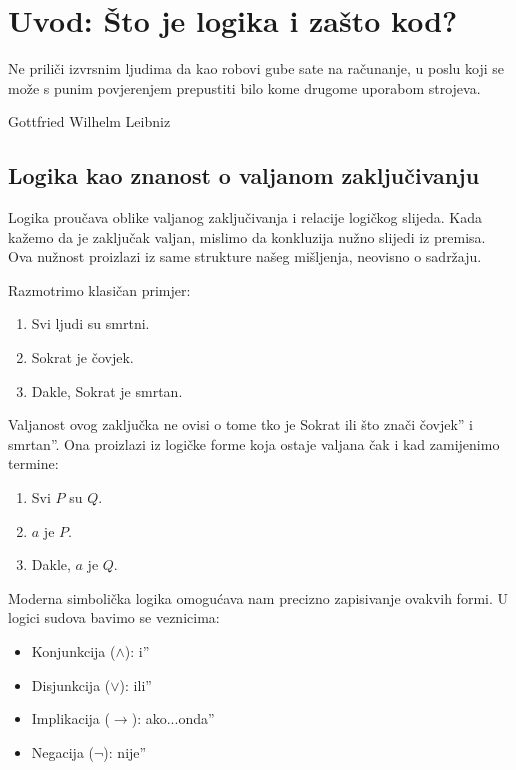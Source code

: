 \chapter{Uvod: Što je logika i zašto kod?}


\epigraph{Ne priliči izvrsnim ljudima da kao robovi gube sate na računanje, u poslu koji se može s punim povjerenjem prepustiti bilo kome drugome uporabom strojeva.}{Gottfried Wilhelm Leibniz\footnotemark}


\section{Logika kao znanost o valjanom zaključivanju}


Logika proučava oblike valjanog zaključivanja i relacije logičkog slijeda. Kada kažemo da je zaključak valjan, mislimo da konkluzija nužno slijedi iz premisa. Ova nužnost proizlazi iz same strukture našeg mišljenja, neovisno o sadržaju.


Razmotrimo klasičan primjer:
\begin{enumerate}
\item Svi ljudi su smrtni.
\item Sokrat je čovjek.
\item Dakle, Sokrat je smrtan.
\end{enumerate}


Valjanost ovog zaključka ne ovisi o tome tko je Sokrat ili što znači čovjek'' i smrtan''. Ona proizlazi iz logičke forme koja ostaje valjana čak i kad zamijenimo termine:
\begin{enumerate}
\item Svi $P$ su $Q$.
\item $a$ je $P$.
\item Dakle, $a$ je $Q$.
\end{enumerate}


Moderna simbolička logika omogućava nam precizno zapisivanje ovakvih formi. U logici sudova bavimo se veznicima:
\begin{itemize}
\item Konjunkcija ($\wedge$): i'' \item Disjunkcija ($\vee$): ili''

\item Implikacija ($\rightarrow$): ako...onda'' \item Negacija ($\neg$): nije''
\end{itemize}


